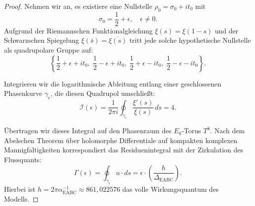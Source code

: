 \documentclass[11pt,a4paper]{article}
\theoremstyle{definition}
\theoremstyle{remark}
\numberwithin{equation}{section}
\begin{document}
\begin{proof}
Nehmen wir an, es existiere eine Nullstelle $\rho_0 = \sigma_0 + i t_0$ mit
\begin{equation}
\sigma_0 = \frac{1}{2} + \epsilon, \quad \epsilon \neq 0.
\end{equation}
Aufgrund der Riemannschen Funktionalgleichung $\xi(s) = \xi(1-s)$ und der Schwarzschen Spiegelung $\xi(\bar{s}) = \overline{\xi(s)}$ tritt jede solche hypothetische Nullstelle als quadrupolare Gruppe auf:
\begin{equation}
\left\{ \frac{1}{2} + \epsilon + i t_0, \; \frac{1}{2} - \epsilon + i t_0, \; \frac{1}{2} + \epsilon - i t_0, \; \frac{1}{2} - \epsilon - i t_0 \right\}.
\end{equation}

Integrieren wir die logarithmische Ableitung entlang einer geschlossenen Phasenkurve $\gamma_\epsilon$, die diesen Quadrupol umschließt:
\begin{equation}
\mathcal{I}(\epsilon) = \frac{1}{2\pi i} \oint_{\gamma_\epsilon} \frac{\xi'(s)}{\xi(s)} \, ds = 4.
\end{equation}

Übertragen wir dieses Integral auf den Phasenraum des $E_8$-Torus $T^8$. Nach dem Abelschen Theorem über holomorphe Differentiale auf kompakten komplexen Mannigfaltigkeiten korrespondiert das Residuenintegral mit der Zirkulation des Flussquants:
\begin{equation}
\Gamma(\epsilon) = \oint_{\gamma_\epsilon} u \cdot ds = \epsilon \cdot \left( \frac{h}{\Delta_{\mathrm{EABC}}} \right).
\end{equation}
Hierbei ist $h = 2\pi\alpha^{-1}_{\mathrm{EABC}} \approx 861{,}022576$ das volle Wirkungsquantum des Modells.


\end{proof}
\end{document}
